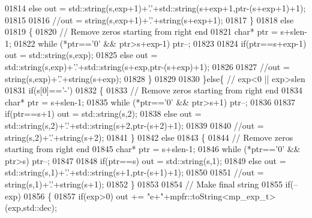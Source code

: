 \begin{DoxyCode}
{01814                 \textcolor{keywordflow}{else}           out = std::string(s,exp+1)+\textcolor{charliteral}{'.'}+std::string(s+exp+1,ptr-(s+exp+1)+1);
01815 
01816                 \textcolor{comment}{//out = string(s,exp+1)+'.'+string(s+exp+1);}
01817             \}
01818             \textcolor{keywordflow}{else}
01819             \{
01820                 \textcolor{comment}{// Remove zeros starting from right end}
01821                 \textcolor{keywordtype}{char}* ptr = s+slen-1;
01822                 \textcolor{keywordflow}{while} (*ptr==\textcolor{charliteral}{'0'} && ptr>s+exp-1) ptr--;
01823 
01824                 \textcolor{keywordflow}{if}(ptr==s+exp-1) out = std::string(s,exp);
01825                 \textcolor{keywordflow}{else}             out = std::string(s,exp)+\textcolor{charliteral}{'.'}+std::string(s+exp,ptr-(s+exp)+1);
01826 
01827                 \textcolor{comment}{//out = string(s,exp)+'.'+string(s+exp);}
01828             \}
01829 
01830         \}\textcolor{keywordflow}{else}\{ \textcolor{comment}{// exp<0 || exp>slen}
01831             \textcolor{keywordflow}{if}(s[0]==\textcolor{charliteral}{'-'})
01832             \{
01833                 \textcolor{comment}{// Remove zeros starting from right end}
01834                 \textcolor{keywordtype}{char}* ptr = s+slen-1;
01835                 \textcolor{keywordflow}{while} (*ptr==\textcolor{charliteral}{'0'} && ptr>s+1) ptr--;
01836 
01837                 \textcolor{keywordflow}{if}(ptr==s+1) out = std::string(s,2);
01838                 \textcolor{keywordflow}{else}         out = std::string(s,2)+\textcolor{charliteral}{'.'}+std::string(s+2,ptr-(s+2)+1);
01839 
01840                 \textcolor{comment}{//out = string(s,2)+'.'+string(s+2);}
01841             \}
01842             \textcolor{keywordflow}{else}
01843             \{
01844                 \textcolor{comment}{// Remove zeros starting from right end}
01845                 \textcolor{keywordtype}{char}* ptr = s+slen-1;
01846                 \textcolor{keywordflow}{while} (*ptr==\textcolor{charliteral}{'0'} && ptr>s) ptr--;
01847 
01848                 \textcolor{keywordflow}{if}(ptr==s) out = std::string(s,1);
01849                 \textcolor{keywordflow}{else}       out = std::string(s,1)+\textcolor{charliteral}{'.'}+std::string(s+1,ptr-(s+1)+1);
01850 
01851                 \textcolor{comment}{//out = string(s,1)+'.'+string(s+1);}
01852             \}
01853 
01854             \textcolor{comment}{// Make final string}
01855             \textcolor{keywordflow}{if}(--exp)
01856             \{
01857                 \textcolor{keywordflow}{if}(exp>0) out += \textcolor{stringliteral}{"e+"}+mpfr::toString<mp\_exp\_t>(exp,std::dec);
}
\end{DoxyCode}
